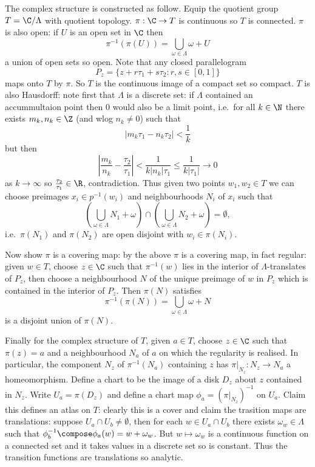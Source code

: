 \documentclass[a4paper]{article}
\begin{document}
The complex structure is constructed as follow. Equip the quotient group \(T = \C / \Lambda\) with quotient topology. \(\pi: \C \to T\) is continuous so \(T\) is connected. \(\pi\) is also open: if \(U\) is an open set in \(\C\) then
\[
    \pi^{-1}(\pi(U)) = \bigcup_{\omega \in \Lambda} \omega + U
  \]
  a union of open sets so open. Note that any closed parallelogram
  \[
    P_z = \{z + r \tau_1 + s \tau_2: r, s \in [0, 1]\}
  \]
  maps onto \(T\) by \(\pi\). So \(T\) is the continuous image of a compact set so compact. \(T\) is also Hausdorff: note first that \(\Lambda\) is a discrete set: if \(\Lambda\) contained an accummultaion point then \(0\) would also be a limit point, i.e.\ for all \(k \in \N\) there exists \(m_k, n_k \in \Z\) (and wlog \(n_k \neq 0\)) such that
  \[
    |m_k \tau_1 - n_k \tau_2| < \frac{1}{k}
  \]
  but then
  \[
    \left| \frac{m_k}{n_k} - \frac{\tau_2}{\tau_1} \right|
    < \frac{1}{k|n_k|\tau_1}
    \leq \frac{1}{k|\tau_1|}
    \to 0
  \]
  as \(k \to \infty\) so \(\frac{\tau_2}{\tau_1} \in \R\), contradiction. Thus given two points \(w_1, w_2 \in T\) we can choose preimages \(x_i \in p^{-1}(w_i)\) and neighbourhoods \(N_i\) of \(x_i\) such that
  \[
    \left( \bigcup_{\omega \in \Lambda} N_1 + \omega \right) \cap \left( \bigcup_{\omega \in \Lambda} N_2 + \omega \right) = \emptyset,
  \]
  i.e.\ \(\pi(N_1)\) and \(\pi(N_2)\) are open disjoint with \(w_i \in \pi(N_i)\).

  Now show \(\pi\) is a covering map: by the above \(\pi\) is a covering map, in fact regular: given \(w \in T\), choose \(z \in \C\) such that \(\pi^{-1}(w)\) lies in the interior of \(\Lambda\)-translates of \(P_z\), then choose a neighbourhood \(N\) of the unique preimage of \(w\) in \(P_z\) which is contained in the interior of \(P_z\). Then \(\pi(N)\) satisfies
  \[
    \pi^{-1}(\pi(N)) = \bigcup_{\omega \in \Lambda} \omega + N
  \]
  is a disjoint union of \(\pi(N)\).

  Finally for the complex structure of \(T\), given \(a \in T\), choose \(z \in \C\) such that \(\pi(z) = a\) and a neighbourhood \(N_a\) of \(a\) on which the regularity is realised. In particular, the component \(N_z\) of \(\pi^{-1}(N_a)\) containing \(z\) has \(\pi|_{N_z}: N_z \to N_a\) a homeomorphism. Define a chart to be the image of a disk \(D_z\) about \(z\) contained in \(N_z\). Write \(U_a = \pi(D_z)\) and define a chart map \(\phi_a = (\pi|_{N_z})^{-1}\) on \(U_a\). Claim this defines an atlas on \(T\): clearly this is a cover and claim the trasition maps are translations: suppose \(U_a \cap U_b \neq \emptyset\), then for each \(w \in U_a \cap U_b\) there exists \(\omega_w \in \Lambda\) such that \(\phi_b^{-1} \compose \phi_a(w) = w + \omega_w\). But \(w \mapsto \omega_w\) is a continuous function on a connected set and it takes values in a discrete set so is constant. Thus the transition functions are translations so analytic.
\end{document}
